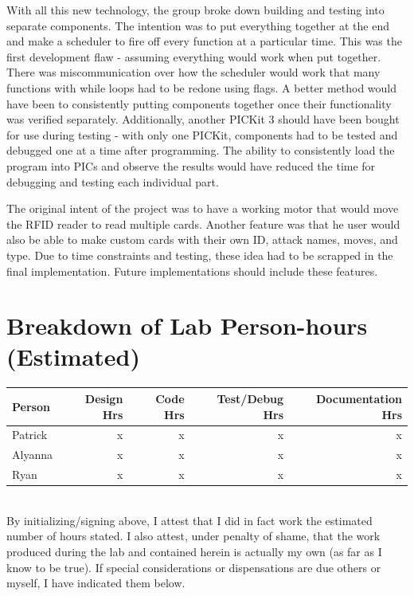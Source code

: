\documentclass[12pt]{article} %
\begin{document}
\begin{itemize}
With all this new technology, the group broke down building and testing into separate components. The intention was to put everything
together at the end and make a scheduler to fire off every function at a particular time. This was the first development flaw - assuming
everything would work when put together. There was miscommunication over how the scheduler would work that many functions with while 
loops had to be redone using flags. A better method would have been to consistently putting components together once their functionality
was verified separately. Additionally, another PICKit 3 should have been bought for use during testing - with only one PICKit, components
had to be tested and debugged one at a time after programming. The ability to consistently load the program into PICs and observe the results
would have reduced the time for debugging and testing each individual part.

The original intent of the project was to have a working motor that would move the
RFID reader to read multiple cards. Another feature was that he user would also be able to make custom cards
with their own ID, attack names, moves, and type. Due to time constraints and testing, these idea had
to be scrapped in the final implementation. Future implementations should include these features.

\pagebreak
\appendix


\section{Breakdown of Lab Person-hours (Estimated)}
\begin{tabular}{|l|*{4}{r|}}
	\hline
	Person & Design Hrs & Code Hrs & Test/Debug Hrs & Documentation Hrs \\ \hline
	Patrick & x & x & x & x  \\ \hline
	Alyanna & x & x & x & x \\ \hline
	Ryan & x & x & x & x  \\ \hline
\end{tabular}

~\\

By initializing/signing above, I attest that I did in fact work the
estimated number of hours stated. I also attest, under penalty of shame,
that the work produced during the lab and contained herein is actually my
own (as far as I know to be true). If special considerations or
dispensations are due others or myself, I have indicated them below.


\end{itemize}
\end{document}
